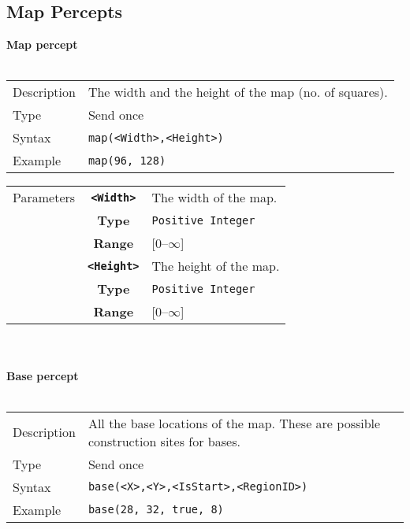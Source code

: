 \subsection{Map Percepts}
\textbf{Map percept}\\
\\
\begin{tabularx}{\textwidth}{lX}
 Description & The width and the height of the map (no. of squares). \\
 Type & Send once \\
 Syntax & \verb|map(<Width>,<Height>)| \\
 Example & \verb|map(96, 128)| \\
 \end{tabularx}
 \begin{tabularx}{\textwidth}{l | c | p{8cm}|}
 \cline{2-3}
  Parameters & \textbf{\verb|<Width>|} & The width of the map.\\
            & \textbf{Type} & \verb|Positive Integer| \\
            & \textbf{Range} & [0--$\infty$] \\
            \cline{2-3}
            & \textbf{\verb|<Height>|} & The height of the map. \\
            & \textbf{Type} & \verb|Positive Integer| \\
            & \textbf{Range} & [0--$\infty$] \\
            \cline{2-3}
\end{tabularx}\\
\\
\noindent
\textbf{Base percept}\\
\\
\begin{tabularx}{\textwidth}{lX}
 Description & All the base locations of the map. These are possible construction sites for bases. \\
 Type & Send once \\
 Syntax & \verb|base(<X>,<Y>,<IsStart>,<RegionID>)| \\
 Example & \verb|base(28, 32, true, 8)| \\
 \end{tabularx}
